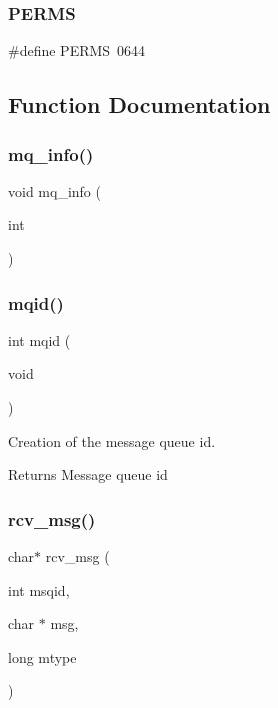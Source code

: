 \subsubsection{P\+E\+R\+MS}
{\footnotesize\ttfamily \#define P\+E\+R\+MS~0644}



\subsection{Function Documentation}
\mbox{\label{mq_8h_abd23771ce4522444ca0cbdad8413515d}} 
\subsubsection{mq\+\_\+info()}
{\footnotesize\ttfamily void mq\+\_\+info (\begin{DoxyParamCaption}\item[{int}]{ }\end{DoxyParamCaption})}

\mbox{\label{mq_8h_a09c20d0a7874e29781d83b7243f58582}} 
\subsubsection{mqid()}
{\footnotesize\ttfamily int mqid (\begin{DoxyParamCaption}\item[{void}]{ }\end{DoxyParamCaption})}



Creation of the message queue id. 

\begin{DoxyReturn}{Returns}
Message queue id 
\end{DoxyReturn}
\mbox{\label{mq_8h_a07daba13b107a4b924dafaa1acf84235}} 
\subsubsection{rcv\+\_\+msg()}
{\footnotesize\ttfamily char$\ast$ rcv\+\_\+msg (\begin{DoxyParamCaption}\item[{int}]{msqid,  }\item[{char $\ast$}]{msg,  }\item[{long}]{mtype }\end{DoxyParamCaption})}



